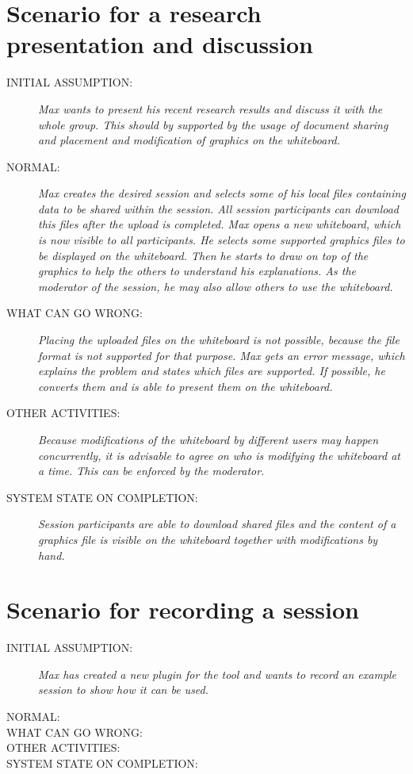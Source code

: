 \section{Scenario for a research presentation and discussion}
\begin{description}
\item[INITIAL ASSUMPTION:]
\textit{Max wants to present his recent research results and discuss it with the
whole group. This should by supported by the usage of document sharing and placement 
and modification of graphics on the whiteboard.}
\item[NORMAL:]
\textit{Max creates the desired session and selects some of his local files
containing data to be shared within the session. All session participants can download this
files after the upload is completed. Max opens a new whiteboard, which is
now visible to all participants. He selects some supported graphics files to be 
displayed on the whiteboard. Then he starts to draw on top of the graphics to
help the others to understand his explanations. As the moderator of the
session, he may also allow others to use the whiteboard.}
\item[WHAT CAN GO WRONG:]
\textit{Placing the uploaded files on the whiteboard is not possible, because the
file format is not supported for that purpose. Max gets an error message, which
explains the problem and states which files are supported. If possible, he
converts them and is able to present them on the whiteboard.}
\item[OTHER ACTIVITIES:]
\textit{Because modifications of the whiteboard by different users may happen
concurrently, it is advisable to agree on who is modifying the whiteboard
at a time. This can be enforced by the moderator.}
\item[SYSTEM STATE ON COMPLETION:]
\textit{Session participants are able to download shared files and
the content of a graphics file is visible on the whiteboard together with
modifications by hand.}
\end{description}


\section{Scenario for recording a session}
\begin{description}
\item[INITIAL ASSUMPTION:]
\textit{Max has created a new plugin for the tool and wants to record an example
session to show how it can be used.}
\item[NORMAL:]
\item[WHAT CAN GO WRONG:]
\item[OTHER ACTIVITIES:]
\item[SYSTEM STATE ON COMPLETION:]
\end{description}